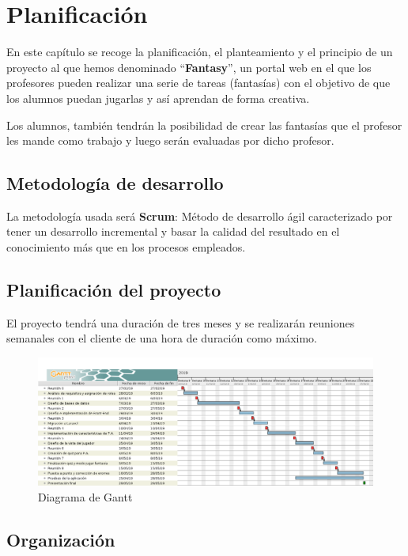 \chapter{Planificación}
En este capítulo se recoge la planificación, el planteamiento y el principio de un proyecto al que hemos denominado ``\textbf{Fantasy}'', un portal web en el que los profesores pueden realizar una serie de tareas (fantasías) con el objetivo de que los alumnos puedan jugarlas y así aprendan de forma creativa.

Los alumnos, también tendrán la posibilidad de crear las fantasías que el profesor les mande como trabajo y luego serán evaluadas por dicho profesor.

\section{Metodología de desarrollo}
La metodología usada será \textbf{Scrum}: Método de desarrollo ágil caracterizado por tener un desarrollo incremental y basar la calidad del resultado en el conocimiento más que en los procesos empleados.

\section{Planificación del proyecto}
El proyecto tendrá una duración de tres meses y se realizarán reuniones semanales con el cliente de una hora de duración como máximo.
\newpage
\begin{figure}[h]
	\centering
	\includegraphics[scale=0.35]{Fantasy.png}
	\caption{Diagrama de Gantt}
	\label{Diagrama de Gantt}
\end{figure}

\section{Organización}

